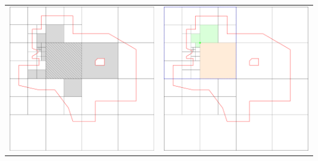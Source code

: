 \documentclass[border=2]{standalone}
\begin{document}
    \begin{tabular}{cc}
        \includegraphics[scale=0.4]{emptycells} & \includegraphics[scale=0.4]{example1} \\

\end{tabular}
\end{document}
